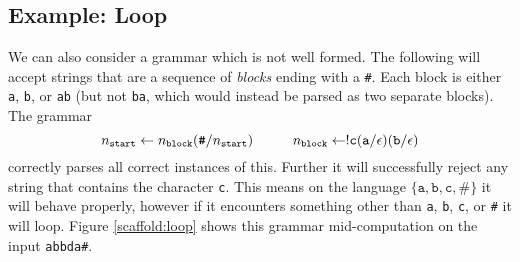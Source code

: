 \subsection{Example: Loop}
We can also consider a grammar which is not well formed.  The following will accept strings that are a sequence of \emph{blocks} ending with a {\tt \#}.  Each block is either {\tt a}, {\tt b}, or {\tt ab} (but not {\tt ba}, which would instead be parsed as two separate blocks).  The grammar
\[ n_{\texttt{start}} \leftarrow n_{\texttt{block}} ( \texttt{\#} / n_{\texttt{start}} ) \hspace*{1cm} n_{\texttt{block}} \leftarrow !\texttt{c} (\texttt{a} / \epsilon) (\texttt{b} / \epsilon) \]
correctly parses all correct instances of this.  Further it will successfully reject any string that contains the character {\tt c}.  This means on the language $\lbrace \texttt{a}, \texttt{b}, \texttt{c}, \texttt{\#} \rbrace$ it will behave properly, however if it encounters something other than {\tt a}, {\tt b}, {\tt c}, or {\tt \#}  it will loop.  Figure \ref{scaffold:loop} shows this grammar mid-computation on the input {\tt abbda\#}.

